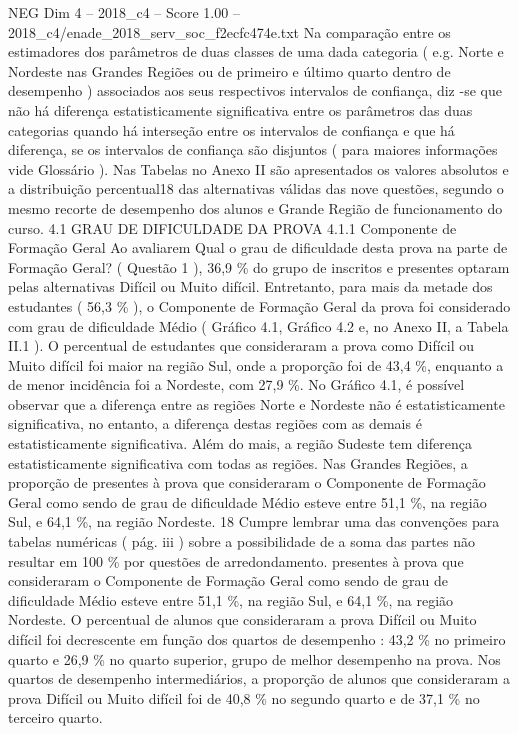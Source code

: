 \begin{textsample}{NEG Dim 4 – 2018\_c4 – Score 1.00 – 2018\_c4/enade\_2018\_serv\_soc\_f2ecfc474e.txt}
Na comparação entre os estimadores dos parâmetros de duas classes de uma dada categoria ( e.g.
Norte e Nordeste nas Grandes Regiões ou de primeiro e último quarto dentro de desempenho ) associados aos seus respectivos intervalos de confiança, diz -se que não há diferença estatisticamente significativa entre os parâmetros das duas categorias quando há interseção entre os intervalos de confiança e que há diferença, se os intervalos de confiança são disjuntos ( para maiores informações vide Glossário ).
Nas Tabelas no Anexo II são apresentados os valores absolutos e a distribuição percentual18 das alternativas válidas das nove questões, segundo o mesmo recorte de desempenho dos alunos e Grande Região de funcionamento do curso. 4.1 GRAU DE DIFICULDADE DA PROVA 4.1.1 Componente de Formação Geral Ao avaliarem Qual o grau de dificuldade desta prova na parte de Formação Geral? ( Questão 1 ), 36,9 \% do grupo de inscritos e presentes optaram pelas alternativas Difícil ou Muito difícil.
Entretanto, para mais da metade dos estudantes ( 56,3 \% ), o Componente de Formação Geral da prova foi considerado com grau de dificuldade Médio ( Gráfico 4.1, Gráfico 4.2 e, no Anexo II, a Tabela II.1 ).
O percentual de estudantes que consideraram a prova como Difícil ou Muito difícil foi maior na região Sul, onde a proporção foi de 43,4 \%, enquanto a de menor incidência foi a Nordeste, com 27,9 \%.
No Gráfico 4.1, é possível observar que a diferença entre as regiões Norte e Nordeste não é estatisticamente significativa, no entanto, a diferença destas regiões com as demais é estatisticamente significativa.
Além do mais, a região Sudeste tem diferença estatisticamente significativa com todas as regiões.
Nas Grandes Regiões, a proporção de presentes à prova que consideraram o Componente de Formação Geral como sendo de grau de dificuldade Médio esteve entre 51,1 \%, na região Sul, e 64,1 \%, na região Nordeste. 18 Cumpre lembrar uma das convenções para tabelas numéricas ( pág. iii ) sobre a possibilidade de a soma das partes não resultar em 100 \% por questões de arredondamento. presentes à prova que consideraram o Componente de Formação Geral como sendo de grau de dificuldade Médio esteve entre 51,1 \%, na região Sul, e 64,1 \%, na região Nordeste.
O percentual de alunos que consideraram a prova Difícil ou Muito difícil foi decrescente em função dos quartos de desempenho : 43,2 \% no primeiro quarto e 26,9 \% no quarto superior, grupo de melhor desempenho na prova.
Nos quartos de desempenho intermediários, a proporção de alunos que consideraram a prova Difícil ou Muito difícil foi de 40,8 \% no segundo quarto e de 37,1 \% no terceiro quarto.

\end{textsample}
